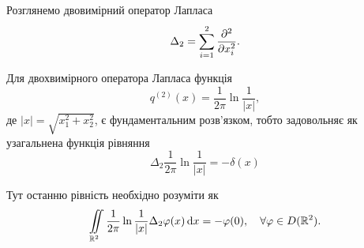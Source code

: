 Розглянемо двовимірний оператор Лапласа 
\begin{equation}
	\Delta_2 = \displaystyle\sum\limits_{i = 1}^2 \frac{\partial^2}{\partial x_i^2}.
\end{equation}

\begin{theorem}
	Для двохвимірного оператора Лапласа функція
	\begin{equation}
		q^{(2)}(x) = \frac{1}{2 \pi} \ln \frac{1}{|x|},
	\end{equation}
	де $|x| = \sqrt{x_1^2 + x_2^2}$, є фундаментальним розв'язком, тобто задовольняє як узагальнена функція рівняння
	\begin{equation}
		\Delta_2 \frac{1}{2 \pi} \ln \frac{1}{|x|} = - \delta(x)
	\end{equation}
\end{theorem}

\begin{remark}
	Тут останню рівність необхідно розуміти як
	\begin{equation}
		\displaystyle\iint\limits_{\mathbb{R}^2} \frac{1}{2 \pi} \ln \frac{1}{|x|} \Delta_2 \varphi(x) \mathop{}\!\mathrm{d} x = - \varphi(0), \quad \forall \varphi \in D(\mathbb{R}^2).
	\end{equation}
\end{remark}

